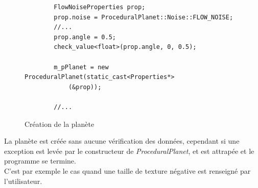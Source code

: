   \begin{figure}
    \centering
      \lstset{language=C++}
      \begin{lstlisting}
        FlowNoiseProperties prop;
        prop.noise = ProceduralPlanet::Noise::FLOW_NOISE;
        //...
        prop.angle = 0.5;
        check_value<float>(prop.angle, 0, 0.5);
        
        m_pPlanet = new ProceduralPlanet(static_cast<Properties*> 
            (&prop));
            
        //...
      \end{lstlisting}    
      \caption{Création de la planète}
      \label{fig:code_scene}
  \end{figure}
  
  
  La planète est créée sans aucune vérification des données, cependant si une exception est levée par le constructeur de \textit{ProceduralPlanet}, et est attrapée et le programme se termine.\\
  C'est par exemple le cas quand une taille de texture négative est renseigné par l'utilisateur.
  